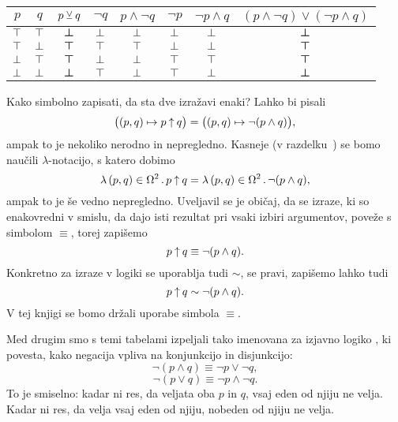 		\begin{center}
			\begin{tabular}{cc|cccccc}
				$p$ & $q$ & $p \mathbin{\veebar} q$ & $\lnot{q}$ & $p \land \lnot{q}$ & $\lnot{p}$ & $\lnot{p} \land q$ & $(p \land \lnot{q}) \lor (\lnot{p} \land q)$  \\
				\hline
				$\top$ & $\top$ & $\bm{\bot}$ & $\bot$ & $\bot$ & $\bot$ & $\bot$ & $\bm{\bot}$ \\
				$\top$ & $\bot$ & $\bm{\top}$ & $\top$ & $\top$ & $\bot$ & $\bot$ & $\bm{\top}$ \\
				$\bot$ & $\top$ & $\bm{\top}$ & $\bot$ & $\bot$ & $\top$ & $\top$ & $\bm{\top}$ \\
				$\bot$ & $\bot$ & $\bm{\bot}$ & $\top$ & $\bot$ & $\top$ & $\bot$ & $\bm{\bot}$
			\end{tabular}
		\end{center}
		
		Kako simbolno zapisati, da sta dve izražavi enaki? Lahko bi pisali
		\[\big((p, q) \mapsto p \mathbin{\uparrow} q\big) = \big((p, q) \mapsto \lnot(p \land q)\big),\]
		ampak to je nekoliko nerodno in nepregledno. Kasneje (v razdelku~) se bomo naučili $\lambda$-notacijo, s katero dobimo
		\[\xlam{(p, q)}[\tvs^2]{p \shf q} = \xlam{(p, q)}[\tvs^2]{\lnot(p \land q)},\]
		ampak to je še vedno nepregledno. Uveljavil se je običaj, da se izraze, ki so enakovredni v smislu, da dajo isti rezultat pri vsaki izbiri argumentov, poveže s simbolom $\equiv$, torej zapišemo
		\[p \mathbin{\uparrow} q \equiv \lnot(p \land q).\]
		Konkretno za izraze v logiki se uporablja tudi $\sim$, se pravi, zapišemo lahko tudi
		\[p \mathbin{\uparrow} q \sim \lnot(p \land q).\]
		V tej knjigi se bomo držali uporabe simbola $\equiv$. 
		
		Med drugim smo s temi tabelami izpeljali tako imenovana  za izjavno logiko , ki povesta, kako negacija vpliva na konjunkcijo in disjunkcijo:
		\[\lnot(p \land q) \equiv \lnot{p} \lor \lnot{q},\]
		\[\lnot(p \lor q) \equiv \lnot{p} \land \lnot{q}.\]
		To je smiselno: kadar ni res, da veljata oba $p$ in $q$, vsaj eden od njiju ne velja. Kadar ni res, da velja vsaj eden od njiju, nobeden od njiju ne velja.
		
